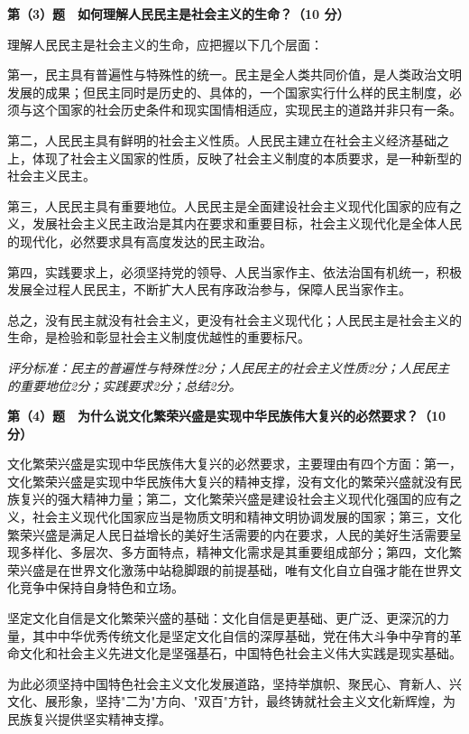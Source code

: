 \documentclass[12pt, a4paper]{article}
\begin{document}
\begin{answerbox}
\vspace{6pt}
\textbf{第（3）题　如何理解人民民主是社会主义的生命？（10 分）}

理解人民民主是社会主义的生命，应把握以下几个层面：

第一，民主具有普遍性与特殊性的统一。民主是全人类共同价值，是人类政治文明发展的成果；但民主同时是历史的、具体的，一个国家实行什么样的民主制度，必须与这个国家的社会历史条件和现实国情相适应，实现民主的道路并非只有一条。

第二，人民民主具有鲜明的社会主义性质。人民民主建立在社会主义经济基础之上，体现了社会主义国家的性质，反映了社会主义制度的本质要求，是一种新型的社会主义民主。

第三，人民民主具有重要地位。人民民主是全面建设社会主义现代化国家的应有之义，发展社会主义民主政治是其内在要求和重要目标，社会主义现代化是全体人民的现代化，必然要求具有高度发达的民主政治。

第四，实践要求上，必须坚持党的领导、人民当家作主、依法治国有机统一，积极发展全过程人民民主，不断扩大人民有序政治参与，保障人民当家作主。

总之，没有民主就没有社会主义，更没有社会主义现代化；人民民主是社会主义的生命，是检验和彰显社会主义制度优越性的重要标尺。

\textit{评分标准：民主的普遍性与特殊性2分；人民民主的社会主义性质2分；人民民主的重要地位2分；实践要求2分；总结2分。}

\vspace{6pt}
\textbf{第（4）题　为什么说文化繁荣兴盛是实现中华民族伟大复兴的必然要求？（10 分）}

文化繁荣兴盛是实现中华民族伟大复兴的必然要求，主要理由有四个方面：第一，文化繁荣兴盛是实现中华民族伟大复兴的精神支撑，没有文化的繁荣兴盛就没有民族复兴的强大精神力量；第二，文化繁荣兴盛是建设社会主义现代化强国的应有之义，社会主义现代化国家应当是物质文明和精神文明协调发展的国家；第三，文化繁荣兴盛是满足人民日益增长的美好生活需要的内在要求，人民的美好生活需要呈现多样化、多层次、多方面特点，精神文化需求是其重要组成部分；第四，文化繁荣兴盛是在世界文化激荡中站稳脚跟的前提基础，唯有文化自立自强才能在世界文化竞争中保持自身特色和立场。

坚定文化自信是文化繁荣兴盛的基础：文化自信是更基础、更广泛、更深沉的力量，其中中华优秀传统文化是坚定文化自信的深厚基础，党在伟大斗争中孕育的革命文化和社会主义先进文化是坚强基石，中国特色社会主义伟大实践是现实基础。

为此必须坚持中国特色社会主义文化发展道路，坚持举旗帜、聚民心、育新人、兴文化、展形象，坚持"二为"方向、"双百"方针，最终铸就社会主义文化新辉煌，为民族复兴提供坚实精神支撑。


\end{answerbox}
\end{document}

